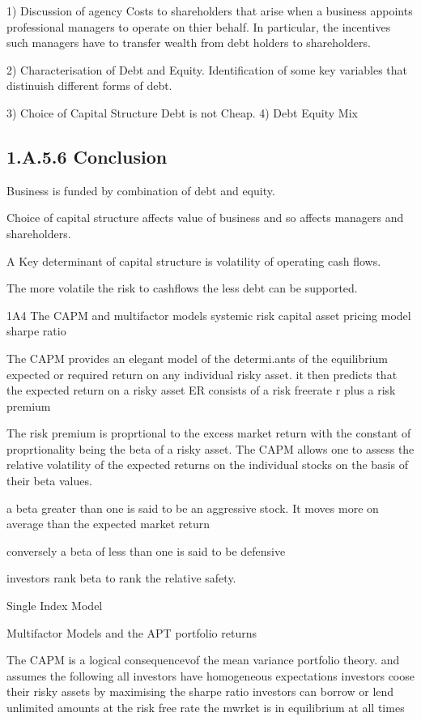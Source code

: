 1) Discussion of agency Costs to shareholders that arise when a business appoints professional managers to operate on thier behalf.
 In particular, the incentives such managers have to transfer wealth from debt holders to shareholders.

2) Characterisation of Debt and Equity. Identification of some key variables that distinuish different forms of debt.

3) Choice of Capital Structure
Debt is not Cheap.
4) Debt Equity Mix


\subsection*{1.A.5.6 Conclusion}

Business is funded by combination of debt and equity.

Choice of capital structure affects value of business and so affects managers and shareholders.

A Key determinant of capital structure is volatility of operating cash flows.

The more volatile the risk to cashflows the less debt can be supported.





1A4
The CAPM and multifactor models
 systemic risk
 capital asset pricing model
 sharpe ratio

The CAPM provides an elegant model of the determi.ants of the equilibrium expected or required return on any individual risky asset.
 it then predicts that the expected return on a risky asset ER consists of a risk freerate r plus a risk premium

 The risk premium is proprtional to the excess market return with the constant of proprtionality being the beta of a risky asset.
The CAPM allows one to assess the relative volatility of the expected returns on the individual stocks on the basis of their beta values.

 a beta greater than one is said to be an aggressive stock. It moves more on average than the expected market return

conversely a beta of less than one is said to be defensive

investors rank beta to rank the relative safety.

Single Index Model

Multifactor Models and the APT
portfolio returns

The CAPM is a logical consequencevof the mean variance portfolio theory.
 and assumes the following
all investors have homogeneous expectations
investors coose their risky assets by maximising the sharpe ratio
investors can borrow or lend unlimited amounts at the risk free rate
the mwrket is in equilibrium at all times

